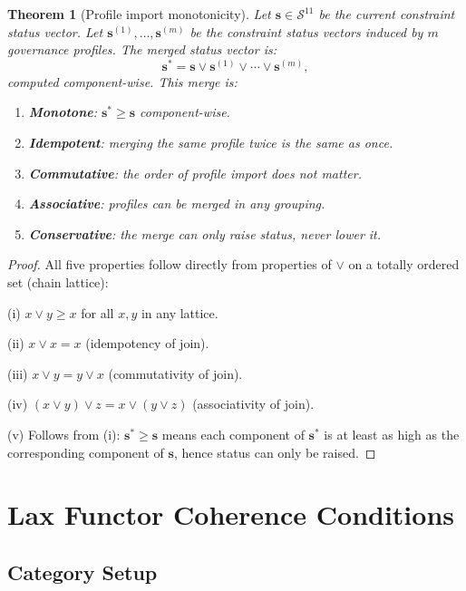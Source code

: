 \documentclass[11pt,letterpaper]{article}
\newtheorem{theorem}{Theorem}[section]
\theoremstyle{remark}
\begin{document}
\begin{theorem}[Profile import monotonicity]
\label{thm:A-monotone}
Let $\mathbf{s} \in \mathcal{S}^{11}$ be the current constraint status
vector. Let $\mathbf{s}^{(1)}, \ldots, \mathbf{s}^{(m)}$ be the constraint
status vectors induced by $m$ governance profiles.
The merged status vector is:
\[
  \mathbf{s}^* = \mathbf{s} \vee \mathbf{s}^{(1)} \vee \cdots \vee \mathbf{s}^{(m)},
\]
computed component-wise. This merge is:
\begin{enumerate}[label=(\roman*)]
  \item \textbf{Monotone}: $\mathbf{s}^* \geq \mathbf{s}$ component-wise.
  \item \textbf{Idempotent}: merging the same profile twice is the same
    as once.
  \item \textbf{Commutative}: the order of profile import does not matter.
  \item \textbf{Associative}: profiles can be merged in any grouping.
  \item \textbf{Conservative}: the merge can only raise status, never
    lower it.
\end{enumerate}
\end{theorem}

\begin{proof}
All five properties follow directly from properties of $\vee$ on a
totally ordered set (chain lattice):

(i) $x \vee y \geq x$ for all $x, y$ in any lattice.

(ii) $x \vee x = x$ (idempotency of join).

(iii) $x \vee y = y \vee x$ (commutativity of join).

(iv) $(x \vee y) \vee z = x \vee (y \vee z)$ (associativity of join).

(v) Follows from (i): $\mathbf{s}^* \geq \mathbf{s}$ means each component
of $\mathbf{s}^*$ is at least as high as the corresponding component
of $\mathbf{s}$, hence status can only be raised.
\end{proof}

\section{Lax Functor Coherence Conditions}
\label{sec:functor}

\subsection{Category Setup}
\end{document}
